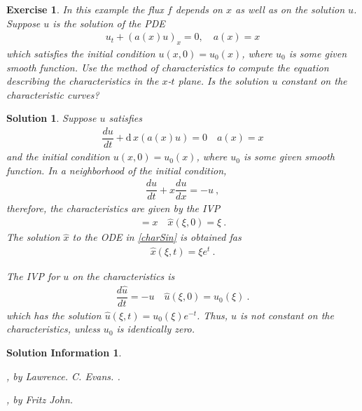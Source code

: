 \documentclass[10pt,letterpaper]{article}
\newcommand{\dif}[1][]{\mathrm{d} {#1}\,}
\newcommand{\rb}[1]{ \left(  {#1} \right) }
\newcommand{\frb}[1]{ \left(  {#1} \right) }
\theoremstyle{break}
\newtheorem{exercise}{Exercise}
\newtheorem{solution}{Solution}
\newtheorem*{solutioninformation}{Solution Information}
\begin{document}
\begin{exercise}
	In this example the flux $f$ depends on $x$ as well as on the solution $u$.
	Suppose $u$ is the solution of the PDE
	\begin{gather}%
		u_t +\rb{a(x)u}_x=0,
		\quad
		a(x)= x
	\end{gather}%
	which satisfies the initial condition $u(x,0)=u_0(x)$, where $u_0$ is some given smooth function.
	Use the method of characteristics to compute the equation describing the characteristics in the $x$-$t$ plane.
	Is the solution $u$ constant on the characteristic curves?
\end{exercise}

\begin{solution}
	Suppose $u$ satisfies
	\begin{gather}
		\dfrac{du}{dt}+\dif{}{x}\rb{a(x)u}=0
		\quad
		a(x)=x
	\end{gather}
	and the initial condition $u(x,0)=u_0(x)$, where $u_0$ is some given smooth function.
	In a neighborhood of the initial condition,
	\begin{gather}
		\dfrac{du}{dt}+x \dfrac{du}{dx}=-u\ ,
	\end{gather}
	therefore, the characteristics are given by the IVP
	\begin{gather} \label{charSin}
		=x
		\quad
		\hat x\frb{\xi,0}=\xi\ .
	\end{gather}
	The solution $\hat x$ to the ODE in \eqref{charSin} is obtained fas
	\begin{gather}
		\hat x\frb{\xi,t}=\xi e^t\ .
	\end{gather}
	
	The IVP for $u$ on the characteristics is
	\begin{gather}
		\dfrac{d\hat u}{dt}=-u
		\quad
		\hat u\frb{\xi,0}=u_0\frb{\xi}\ .
	\end{gather}
	which has the solution $\hat u(\xi,t) = u_0(\xi) e^{-t}$. Thus, $u$ is not constant on the characteristics, unless $u_0$ is identically zero.	
\end{solution}

\begin{solutioninformation}
		
	\begin{thebibliography}{----}
		, by Lawrence. C. Evans.
		.
		
		, by Fritz John.	
	\end{thebibliography}

\end{solutioninformation}
\end{document}
